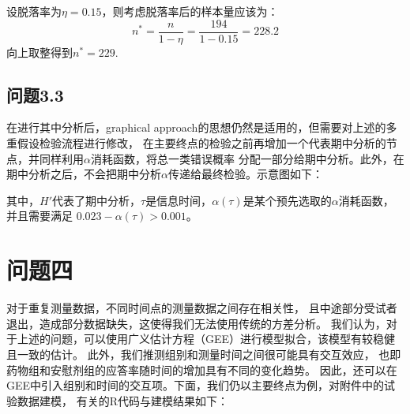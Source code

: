 \documentclass{article}
\begin{document}
设脱落率为$\eta=0.15$，则考虑脱落率后的样本量应该为：
\begin{equation*}
    n^* = \frac{n}{1-\eta} = \frac{194}{1-0.15} = 228.2
\end{equation*}
向上取整得到$n^* = 229$.
\subsection{问题3.3}
在进行其中分析后，graphical approach的思想仍然是适用的，但需要对上述的多重假设检验流程进行修改，
在主要终点的检验之前再增加一个代表期中分析的节点，并同样利用$\alpha$消耗函数，将总一类错误概率
分配一部分给期中分析。此外，在期中分析之后，不会把期中分析$\alpha$传递给最终检验。示意图如下：

    
其中，$H'$代表了期中分析，$\tau$是信息时间，$\alpha(\tau)$是某个预先选取的$\alpha$消耗函数，并且需要满足
$0.023-\alpha(\tau)>0.001$。


\section{问题四}
对于重复测量数据，不同时间点的测量数据之间存在相关性，
且中途部分受试者退出，造成部分数据缺失，这使得我们无法使用传统的方差分析。
我们认为，对于上述的问题，可以使用广义估计方程（GEE）进行模型拟合，该模型有较稳健且一致的估计。
此外，我们推测组别和测量时间之间很可能具有交互效应，
也即药物组和安慰剂组的应答率随时间的增加具有不同的变化趋势。
因此，还可以在GEE中引入组别和时间的交互项。下面，我们仍以主要终点为例，对附件中的试验数据建模，
有关的R代码与建模结果如下：

\end{document}
